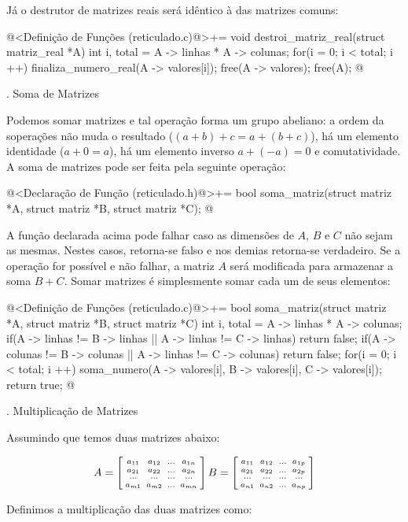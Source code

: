 Já o destrutor de matrizes reais será idêntico à das matrizes comuns:

\iniciocodigo
@<Definição de Funções (reticulado.c)@>+=
void destroi_matriz_real(struct matriz_real *A){
  int i, total = A -> linhas * A -> colunas;
  for(i = 0; i < total; i ++){
    finaliza_numero_real(A -> valores[i]);
  }
  free(A -> valores);
  free(A);
}
@
\fimcodigo


{\tenbold{}. Soma de Matrizes}

Podemos somar matrizes e tal operação forma um grupo abeliano: a ordem
da soperações não muda o resultado ($(a+b)+c = a+(b+c)$), há um
elemento identidade ($a+0=a$), há um elemento inverso $a+(-a)=0$ e
comutatividade. A soma de matrizes pode ser feita pela seguinte
operação:

\iniciocodigo
@<Declaração de Função (reticulado.h)@>+=
bool soma_matriz(struct matriz *A, struct matriz *B, struct matriz *C);
@
\fimcodigo

A função declarada acima pode falhar caso as dimensões de $A$, $B$ e
$C$ não sejam as mesmas. Nestes casos, retorna-se falso e nos demias
retorna-se verdadeiro. Se a operação for possível e não falhar, a
matriz $A$ será modificada para armazenar a soma $B+C$. Somar matrizes
é simplesmente somar cada um de seus elementos:

\iniciocodigo
@<Definição de Funções (reticulado.c)@>+=
bool soma_matriz(struct matriz *A, struct matriz *B, struct matriz *C){
  int i, total = A -> linhas * A -> colunas;
  if(A -> linhas != B -> linhas || A -> linhas != C -> linhas)
    return false;
  if(A -> colunas != B -> colunas || A -> linhas != C -> colunas)
    return false;
  for(i = 0; i < total; i ++)
    soma_numero(A -> valores[i], B -> valores[i], C -> valores[i]);
  return true;
}
@
\fimcodigo

{\tenbold{}. Multiplicação de Matrizes}

Assumindo que temos duas matrizes abaixo:

$$
A=\left[{{a_{11}\atop a_{21}}\atop{\ldots\atop a_{m1}}}
{{a_{12}\atop a_{22}}\atop{\ldots\atop a_{m2}}}
{{\ldots\atop \ldots}\atop{\ldots\atop \ldots}}
{{a_{1n}\atop a_{2n}}\atop{\ldots\atop a_{mn}}}
\right]
B=\left[{{a_{11}\atop a_{21}}\atop{\ldots\atop a_{n1}}}
{{a_{12}\atop a_{22}}\atop{\ldots\atop a_{n2}}}
{{\ldots\atop \ldots}\atop{\ldots\atop \ldots}}
{{a_{1p}\atop a_{2p}}\atop{\ldots\atop a_{np}}}
\right]
$$

Definimos a multiplicação das duas matrizes como:

